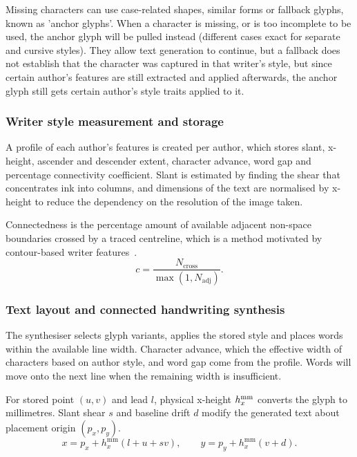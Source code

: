 Missing characters can use case-related shapes, similar forms or fallback glyphs, known as 'anchor glyphs'. When a character is missing, or is too incomplete to be used, the anchor glyph will be pulled instead (different cases exact for separate and cursive styles). They allow text generation to continue, but a fallback does not establish that the character was captured in that writer's style, but since certain author's features are still extracted and applied afterwards, the anchor glyph still gets certain author's style traits applied to it.

\subsubsection{Writer style measurement and storage}
\label{sec:des-profile}
A profile of each author's features is created per author, which stores slant, x-height, ascender and descender extent, character advance, word gap and percentage connectivity coefficient. Slant is estimated by finding the shear that concentrates ink into columns, and dimensions of the text are normalised by x-height to reduce the dependency on the resolution of the image taken.

Connectedness is the percentage amount of available adjacent non-space boundaries crossed by a traced centreline, which is a method motivated by contour-based writer features~\cite[p.~701]{bulacu2007}.
\begin{equation}
c=\frac{N_{\mathrm{cross}}}{\max(1,N_{\mathrm{adj}})}.
\label{eq:des-connectedness}
\end{equation}

\subsubsection{Text layout and connected handwriting synthesis}
\label{sec:des-layout}
The synthesiser selects glyph variants, applies the stored style and places words within the available line width. Character advance, which the effective width of characters based on author style, and word gap come from the profile. Words will move onto the next line when the remaining width is insufficient.

For stored point $(u,v)$ and lead $l$, physical x-height $h_x^{\rm mm}$ converts the glyph to millimetres. Slant shear $s$ and baseline drift $d$ modify the generated text about placement origin $(p_x,p_y)$.
\begin{equation}
x=p_x+h_x^{\mathrm{mm}}(l+u+sv),\qquad
y=p_y+h_x^{\mathrm{mm}}(v+d).
\label{eq:des-placement}
\end{equation}

